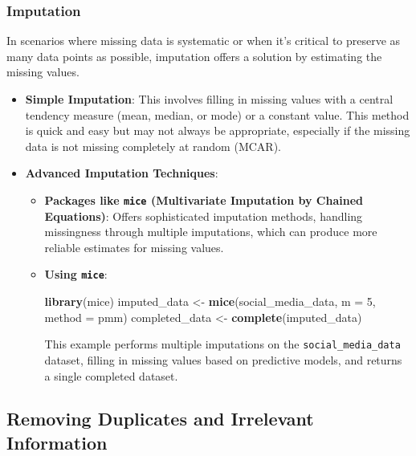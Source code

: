 \documentclass[
]{book}
\newenvironment{Shaded}{\begin{snugshade}}{\end{snugshade}}
\newcommand{\AttributeTok}[1]{\textcolor[rgb]{0.13,0.29,0.53}{#1}}
\newcommand{\DecValTok}[1]{\textcolor[rgb]{0.00,0.00,0.81}{#1}}
\newcommand{\FunctionTok}[1]{\textcolor[rgb]{0.13,0.29,0.53}{\textbf{#1}}}
\newcommand{\NormalTok}[1]{#1}
\newcommand{\OtherTok}[1]{\textcolor[rgb]{0.56,0.35,0.01}{#1}}
\newcommand{\StringTok}[1]{\textcolor[rgb]{0.31,0.60,0.02}{#1}}
\begin{document}
\hypertarget{imputation}{%
\subsubsection{Imputation}\label{imputation}}

In scenarios where missing data is systematic or when it's critical to preserve as many data points as possible, imputation offers a solution by estimating the missing values.

\begin{itemize}
\item
  \textbf{Simple Imputation}: This involves filling in missing values with a central tendency measure (mean, median, or mode) or a constant value. This method is quick and easy but may not always be appropriate, especially if the missing data is not missing completely at random (MCAR).
\item
  \textbf{Advanced Imputation Techniques}:

  \begin{itemize}
  \item
    \textbf{Packages like \texttt{mice} (Multivariate Imputation by Chained Equations)}: Offers sophisticated imputation methods, handling missingness through multiple imputations, which can produce more reliable estimates for missing values.
  \item
    \textbf{Using \texttt{mice}}:

\begin{Shaded}
\begin{Highlighting}[]
\FunctionTok{library}\NormalTok{(mice)}
\NormalTok{imputed\_data }\OtherTok{\textless{}{-}} \FunctionTok{mice}\NormalTok{(social\_media\_data, }\AttributeTok{m =} \DecValTok{5}\NormalTok{, }\AttributeTok{method =} \StringTok{\textquotesingle{}pmm\textquotesingle{}}\NormalTok{)}
\NormalTok{completed\_data }\OtherTok{\textless{}{-}} \FunctionTok{complete}\NormalTok{(imputed\_data)}
\end{Highlighting}
\end{Shaded}

    This example performs multiple imputations on the \texttt{social\_media\_data} dataset, filling in missing values based on predictive models, and returns a single completed dataset.
  \end{itemize}
\end{itemize}

\hypertarget{removing-duplicates-and-irrelevant-information}{%
\subsection{Removing Duplicates and Irrelevant Information}\label{removing-duplicates-and-irrelevant-information}}
\end{document}
